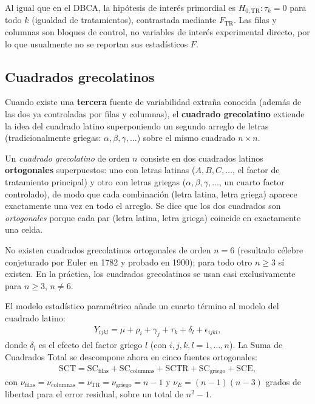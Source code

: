 \begin{observacion}
	Al igual que en el DBCA, la hipótesis de interés primordial es $H_{0,\text{TR}}: \tau_k = 0$ para todo $k$ (igualdad de tratamientos), contrastada mediante $F_{\text{TR}}$. Las filas y columnas son bloques de control, no variables de interés experimental directo, por lo que usualmente no se reportan sus estadísticos $F$.
\end{observacion}

\subsection{Cuadrados grecolatinos}

Cuando existe una \textbf{tercera} fuente de variabilidad extraña conocida (además de las dos ya controladas por filas y columnas), el \textbf{cuadrado grecolatino} extiende la idea del cuadrado latino superponiendo un segundo arreglo de letras (tradicionalmente griegas: $\alpha, \beta, \gamma, \ldots$) sobre el mismo cuadrado $n \times n$.

\begin{definicion}
	Un \emph{cuadrado grecolatino} de orden $n$ consiste en dos cuadrados latinos \textbf{ortogonales} superpuestos: uno con letras latinas ($A, B, C, \ldots$, el factor de tratamiento principal) y otro con letras griegas ($\alpha, \beta, \gamma, \ldots$, un cuarto factor controlado), de modo que cada combinación (letra latina, letra griega) aparece exactamente una vez en todo el arreglo. Se dice que los dos cuadrados son \emph{ortogonales} porque cada par (letra latina, letra griega) coincide en exactamente una celda.
\end{definicion}

\begin{observacion}
	No existen cuadrados grecolatinos ortogonales de orden $n=6$ (resultado célebre conjeturado por Euler en 1782 y probado en 1900); para todo otro $n \geq 3$ sí existen. En la práctica, los cuadrados grecolatinos se usan casi exclusivamente para $n \geq 3$, $n \neq 6$.
\end{observacion}

El modelo estadístico paramétrico añade un cuarto término al modelo del cuadrado latino:
\begin{align}
	Y_{ijkl} = \mu + \rho_i + \gamma_j + \tau_k + \delta_l + \epsilon_{ijkl},
	\label{eq:modelo_cuadrado_grecolatino}
\end{align}
donde $\delta_l$ es el efecto del factor griego $l$ (con $i,j,k,l = 1,\ldots,n$). La Suma de Cuadrados Total se descompone ahora en cinco fuentes ortogonales:
\begin{align}
	\text{SCT} = \text{SC}_{\text{filas}} + \text{SC}_{\text{columnas}} + \text{SCTR} + \text{SC}_{\text{griego}} + \text{SCE},
\end{align}
con $\nu_{\text{filas}} = \nu_{\text{columnas}} = \nu_{\text{TR}} = \nu_{\text{griego}} = n-1$ y $\nu_E = (n-1)(n-3)$ grados de libertad para el error residual, sobre un total de $n^2 - 1$.

